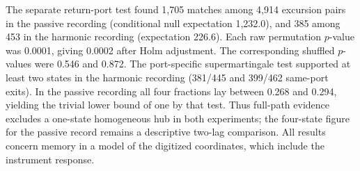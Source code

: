 The separate return-port test found 1,705 matches among 4,914 excursion pairs in the passive recording (conditional null expectation 1,232.0), and 385 among 453 in the harmonic recording (expectation 226.6). Each raw permutation \(p\)-value was 0.0001, giving 0.0002 after Holm adjustment. The corresponding shuffled \(p\)-values were 0.546 and 0.872. The port-specific supermartingale test supported at least two states in the harmonic recording (381/445 and 399/462 same-port exits). In the passive recording all four fractions lay between 0.268 and 0.294, yielding the trivial lower bound of one by that test. Thus full-path evidence excludes a one-state homogeneous hub in both experiments; the four-state figure for the passive record remains a descriptive two-lag comparison. All results concern memory in a model of the digitized coordinates, which include the instrument response.
